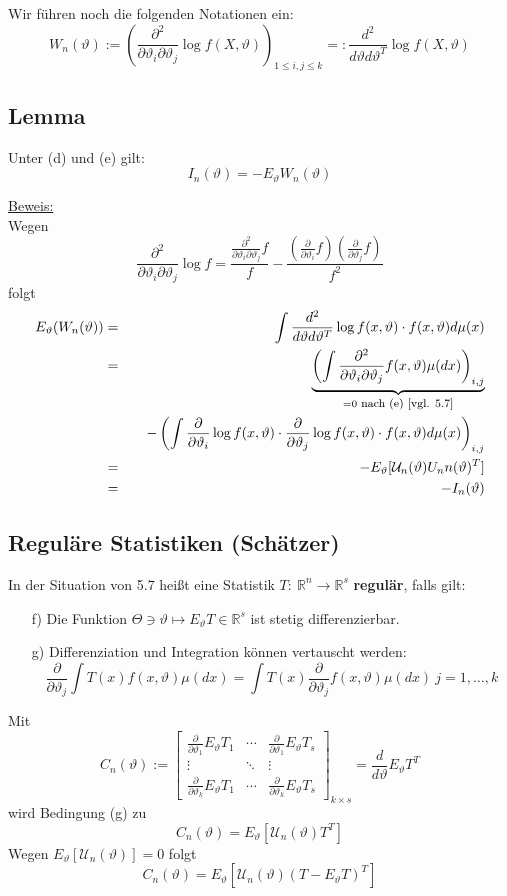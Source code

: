\documentclass[a4paper,11pt,twoside,titlepage]{article}
\newcommand{\R}{{\mathbb R}}
\newcommand\UU{ \mathcal{U} } %
\begin{document}
Wir führen noch die folgenden Notationen ein:
\[W_n(\vartheta):=\left(\frac{\partial^2}{\partial\vartheta_i\partial\vartheta_j}\log f(X,\vartheta)\right)_{1\leq i,j\leq k}=:\frac{d^2}{d\vartheta d\vartheta^T}\log f(X,\vartheta)\]

\subsection{Lemma}
Unter (d) und (e) gilt:
\[I_n(\vartheta)=-E_\vartheta W_n(\vartheta)\]

\underline{Beweis:}\\
Wegen
\[\frac{\partial^2}{\partial\vartheta_i\partial\vartheta_j}\log f=\frac{\frac{\partial^2}{\partial\vartheta_i\partial\vartheta_j}f}{f}-\frac{(\frac{\partial}{\partial\vartheta_i}f)(\frac{\partial}{\partial\vartheta_j}f)}{f^2}\]
folgt
\begin{eqnarray*}
E_\vartheta(W_n(\vartheta))&=&\int \frac{d^2}{d\vartheta d\vartheta^T}\log f(x,\vartheta)\cdot f(x,\vartheta)d\mu(x)\\
&=&\underbrace{\left(\int \frac{\partial^2}{\partial\vartheta_i\partial\vartheta_j} f(x,\vartheta)\mu(dx)\right)_{i,j}}_{=0\textnormal{\footnotesize{ nach (e) [vgl. 5.7]}}}\\&&\quad-\left(\int \frac{\partial}{\partial\vartheta_i}\log f(x,\vartheta)\cdot\frac{\partial}{\partial\vartheta_j}\log f(x,\vartheta)\cdot f(x,\vartheta)d\mu(x)\right)_{i,j}\\
&=&-E_\vartheta[\UU_n(\vartheta)U_nn(\vartheta)^T]\\
&=&-I_n(\vartheta)
\end{eqnarray*}

\subsection{Reguläre Statistiken (Schätzer)}
In der Situation von 5.7 heißt eine Statistik $T:\ \R^n\to\R^s$ \textbf{regulär}, falls gilt:
\begin{itemize}
\item[f)] Die Funktion $\Theta\ni\vartheta\mapsto E_\vartheta T\in\R^s$ ist stetig differenzierbar.
\item[g)] Differenziation und Integration können vertauscht werden:
\[\frac{\partial}{\partial\vartheta_j}\int T(x)f(x,\vartheta)\mu(dx)=\int T(x)\frac{\partial}{\partial\vartheta_j}f(x,\vartheta)\mu(dx)\ j=1,\ldots,k\]
\end{itemize}

Mit
\[C_n(\vartheta):=\left[\begin{array}{ccc}\frac{\partial}{\partial\vartheta_1}E_\vartheta T_1&\cdots&\frac{\partial}{\partial\vartheta_1}E_\vartheta T_s\\\vdots&\ddots&\vdots\\\frac{\partial}{\partial\vartheta_k}E_\vartheta T_1&\cdots&\frac{\partial}{\partial\vartheta_k}E_\vartheta T_s
\end{array}\right]_{k\times s}=\frac{d}{d\vartheta}E_\vartheta T^T\]
wird Bedingung (g) zu
\[C_n(\vartheta)=E_\vartheta[\UU_n(\vartheta)T^T]\]
Wegen $E_\vartheta[\UU_n(\vartheta)]=0$ folgt
\[C_n(\vartheta)=E_\vartheta[\UU_n(\vartheta)(T-E_\vartheta T)^T]\]
\end{document}
